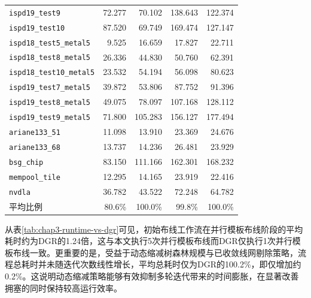 \begin{table}[!htbp]
{\begin{tabular}{l r r r r}
            \texttt{ispd19\_test9} & 72.277 & 70.102 & 138.643 & 122.374 \\
            \texttt{ispd19\_test10} & 87.520 & 69.749 & 169.474 & 127.147 \\
            \texttt{ispd18\_test5\_metal5} & 9.525 & 16.659 & 17.827 & 22.711 \\
            \texttt{ispd18\_test8\_metal5} & 26.336 & 44.830 & 50.760 & 62.391 \\
            \texttt{ispd18\_test10\_metal5} & 23.532 & 54.194 & 56.098 & 80.623 \\
            \texttt{ispd19\_test7\_metal5} & 39.872 & 53.806 & 87.752 & 91.396 \\
            \texttt{ispd19\_test8\_metal5} & 49.075 & 78.097 & 107.168 & 128.112 \\
            \texttt{ispd19\_test9\_metal5} & 71.800 & 105.283 & 156.127 & 177.494 \\
            \texttt{ariane133\_51} & 11.098 & 13.910 & 23.369 & 24.676 \\
            \texttt{ariane133\_68} & 13.737 & 14.236 & 26.481 & 23.929 \\
            \texttt{bsg\_chip} & 83.150 & 111.166 & 162.301 & 168.232 \\
            \texttt{mempool\_tile} & 12.295 & 14.165 & 23.919 & 22.416 \\
            \texttt{nvdla} & 36.782 & 43.522 & 72.248 & 64.782 \\
            \midrule
            平均比例 & 80.6\% & 100.0\% & 99.8\% & 100.0\% \\
            \bottomrule
        \end{tabular}
    }
\end{table}

从表\ref{tab:chap3-runtime-vs-dgr}可见，初始布线工作流在并行模板布线阶段的平均耗时约为DGR的1.24倍，这与本文执行5次并行模板布线而DGR仅执行1次并行模板布线一致。更重要的是，受益于动态缩减树森林规模与已收敛线网剔除策略，流程总耗时并未随迭代次数线性增长，平均总耗时仅为DGR的100.2\%，即仅增加约0.2\%。这说明动态缩减策略能够有效抑制多轮迭代带来的时间膨胀，在显著改善拥塞的同时保持较高运行效率。




